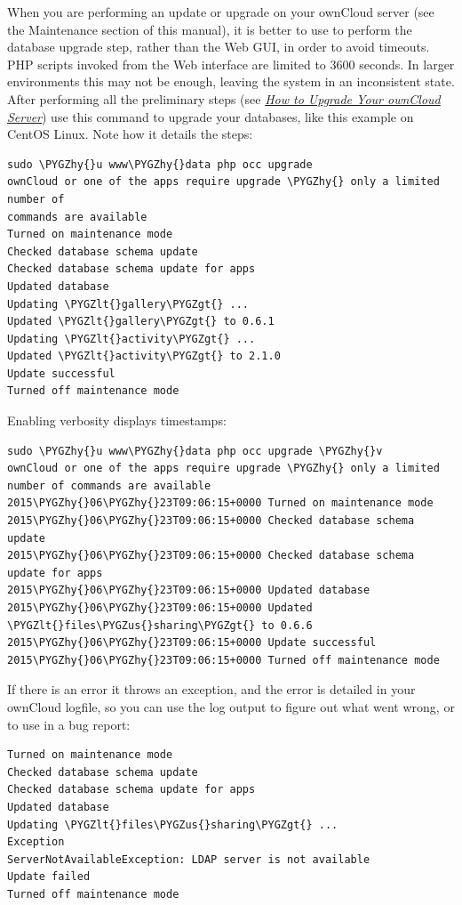 \documentclass[letterpaper,10pt,english]{sphinxmanual}
\def\PYGZus{\char`\_}
\def\PYGZlt{\char`\<}
\def\PYGZgt{\char`\>}
\def\PYGZhy{\char`\-}
\begin{document}
When you are performing an update or upgrade on your ownCloud server (see the
Maintenance section of this manual), it is better to use  to perform the
database upgrade step, rather than the Web GUI, in order to avoid timeouts. PHP
scripts invoked from the Web interface are limited to 3600 seconds. In larger
environments this may not be enough, leaving the system in an inconsistent
state. After performing all the preliminary steps (see
{\hyperref[maintenance/upgrade::doc]{\emph{How to Upgrade Your ownCloud Server}}}) use this command to upgrade your databases,
like this example on CentOS Linux. Note how it details the steps:

\begin{Verbatim}[commandchars=\\\{\}]
sudo \PYGZhy{}u www\PYGZhy{}data php occ upgrade
ownCloud or one of the apps require upgrade \PYGZhy{} only a limited number of
commands are available
Turned on maintenance mode
Checked database schema update
Checked database schema update for apps
Updated database
Updating \PYGZlt{}gallery\PYGZgt{} ...
Updated \PYGZlt{}gallery\PYGZgt{} to 0.6.1
Updating \PYGZlt{}activity\PYGZgt{} ...
Updated \PYGZlt{}activity\PYGZgt{} to 2.1.0
Update successful
Turned off maintenance mode
\end{Verbatim}

Enabling verbosity displays timestamps:

\begin{Verbatim}[commandchars=\\\{\}]
sudo \PYGZhy{}u www\PYGZhy{}data php occ upgrade \PYGZhy{}v
ownCloud or one of the apps require upgrade \PYGZhy{} only a limited number of commands are available
2015\PYGZhy{}06\PYGZhy{}23T09:06:15+0000 Turned on maintenance mode
2015\PYGZhy{}06\PYGZhy{}23T09:06:15+0000 Checked database schema update
2015\PYGZhy{}06\PYGZhy{}23T09:06:15+0000 Checked database schema update for apps
2015\PYGZhy{}06\PYGZhy{}23T09:06:15+0000 Updated database
2015\PYGZhy{}06\PYGZhy{}23T09:06:15+0000 Updated \PYGZlt{}files\PYGZus{}sharing\PYGZgt{} to 0.6.6
2015\PYGZhy{}06\PYGZhy{}23T09:06:15+0000 Update successful
2015\PYGZhy{}06\PYGZhy{}23T09:06:15+0000 Turned off maintenance mode
\end{Verbatim}

If there is an error it throws an exception, and the error is detailed in your
ownCloud logfile, so you can use the log output to figure out what went wrong,
or to use in a bug report:

\begin{Verbatim}[commandchars=\\\{\}]
Turned on maintenance mode
Checked database schema update
Checked database schema update for apps
Updated database
Updating \PYGZlt{}files\PYGZus{}sharing\PYGZgt{} ...
Exception
ServerNotAvailableException: LDAP server is not available
Update failed
Turned off maintenance mode
\end{Verbatim}
\end{document}
